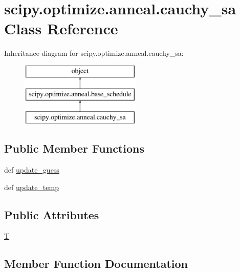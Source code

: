\hypertarget{classscipy_1_1optimize_1_1anneal_1_1cauchy__sa}{}\section{scipy.\+optimize.\+anneal.\+cauchy\+\_\+sa Class Reference}
\label{classscipy_1_1optimize_1_1anneal_1_1cauchy__sa}
Inheritance diagram for scipy.\+optimize.\+anneal.\+cauchy\+\_\+sa\+:\begin{figure}[H]
\begin{center}
\leavevmode
\includegraphics[height=3.000000cm]{classscipy_1_1optimize_1_1anneal_1_1cauchy__sa}
\end{center}
\end{figure}
\subsection*{Public Member Functions}
\begin{DoxyCompactItemize}
\item 
def \hyperlink{classscipy_1_1optimize_1_1anneal_1_1cauchy__sa_a221356981317c695aeb0ad231fb6bd62}{update\+\_\+guess}
\item 
def \hyperlink{classscipy_1_1optimize_1_1anneal_1_1cauchy__sa_aeb250c32a681cbe578d3b513612d60cf}{update\+\_\+temp}
\end{DoxyCompactItemize}
\subsection*{Public Attributes}
\begin{DoxyCompactItemize}
\item 
\hyperlink{classscipy_1_1optimize_1_1anneal_1_1cauchy__sa_ac33eddfb62f408de7a13b0b9a1cfa1de}{T}
\end{DoxyCompactItemize}


\subsection{Member Function Documentation}
\hypertarget{classscipy_1_1optimize_1_1anneal_1_1cauchy__sa_a221356981317c695aeb0ad231fb6bd62}{}

